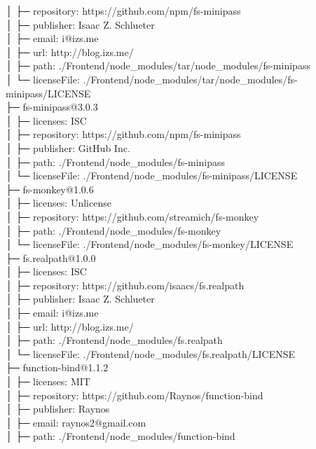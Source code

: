 \documentclass[
    paper=a4,
    twoside=false,
    parskip=half,
    listof=entryprefix,
    listof=totoc,
    index=totoc,
    bibliography=totoc,
    headsepline,
]{scrbook}
\begin{document}
    │  ├─ repository: https://github.com/npm/fs-minipass\\
    │  ├─ publisher: Isaac Z. Schlueter\\
    │  ├─ email: i@izs.me\\
    │  ├─ url: http://blog.izs.me/\\
    │  ├─ path: ./Frontend/node\_modules/tar/node\_modules/fs-minipass\\
    │  └─ licenseFile: ./Frontend/node\_modules/tar/node\_modules/fs-minipass/LICENSE\\
    ├─ fs-minipass@3.0.3\\
    │  ├─ licenses: ISC\\
    │  ├─ repository: https://github.com/npm/fs-minipass\\
    │  ├─ publisher: GitHub Inc.\\
    │  ├─ path: ./Frontend/node\_modules/fs-minipass\\
    │  └─ licenseFile: ./Frontend/node\_modules/fs-minipass/LICENSE\\
    ├─ fs-monkey@1.0.6\\
    │  ├─ licenses: Unlicense\\
    │  ├─ repository: https://github.com/streamich/fs-monkey\\
    │  ├─ path: ./Frontend/node\_modules/fs-monkey\\
    │  └─ licenseFile: ./Frontend/node\_modules/fs-monkey/LICENSE\\
    ├─ fs.realpath@1.0.0\\
    │  ├─ licenses: ISC\\
    │  ├─ repository: https://github.com/isaacs/fs.realpath\\
    │  ├─ publisher: Isaac Z. Schlueter\\
    │  ├─ email: i@izs.me\\
    │  ├─ url: http://blog.izs.me/\\
    │  ├─ path: ./Frontend/node\_modules/fs.realpath\\
    │  └─ licenseFile: ./Frontend/node\_modules/fs.realpath/LICENSE\\
    ├─ function-bind@1.1.2\\
    │  ├─ licenses: MIT\\
    │  ├─ repository: https://github.com/Raynos/function-bind\\
    │  ├─ publisher: Raynos\\
    │  ├─ email: raynos2@gmail.com\\
    │  ├─ path: ./Frontend/node\_modules/function-bind\\
\end{document}
